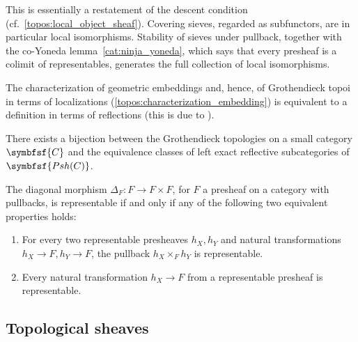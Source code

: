     \begin{remark}
        This is essentially a restatement of the descent condition (cf.~\ref{topos:local_object_sheaf}). Covering sieves, regarded as subfunctors, are in particular local isomorphisms. Stability of sieves under pullback, together with the co-Yoneda lemma~\ref{cat:ninja_yoneda}, which says that every presheaf is a colimit of representables, generates the full collection of local isomorphisms.
    \end{remark}

    The characterization of geometric embeddings and, hence, of Grothendieck topoi in terms of localizations (\cref{topos:characterization_embedding}) is equivalent to a definition in terms of reflections (this is due to ).
    \begin{result}
        There exists a bijection between the Grothendieck topologies on a small category $\symbfsf{C}$ and the equivalence classes of left exact reflective subcategories of $\symbfsf{Psh(C)}$.
    \end{result}


    \begin{property}[Diagonals]\label{topos:representable_diagonal}
        The diagonal morphism $\Delta_F:F\rightarrow F\times F$, for $F$ a presheaf on a category with pullbacks, is representable if and only if any of the following two equivalent properties holds:
        \begin{enumerate}
            \item For every two representable presheaves $h_X,h_Y$ and natural transformations $h_X\rightarrow F,h_Y\rightarrow F$, the pullback $h_X\times_Fh_Y$ is representable.
            \item Every natural transformation $h_X\rightarrow F$ from a representable presheaf is representable.
        \end{enumerate}
    \end{property}

\subsection{Topological sheaves}


